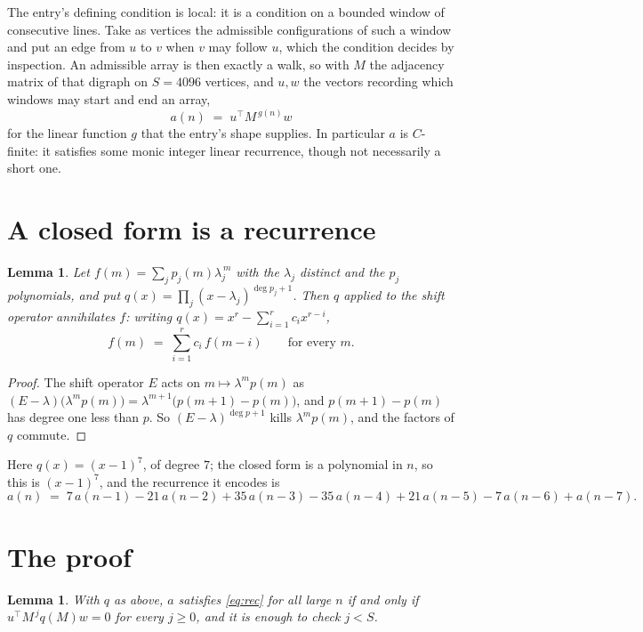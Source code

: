 \documentclass[11pt,a4paper]{article}
\theoremstyle{plain}
\newtheorem{lemma}[theorem]{Lemma}
\theoremstyle{definition}
\begin{document}
The entry's defining condition is local: it is a condition on a bounded window of consecutive lines. Take as vertices the
admissible configurations of such a window and put an edge from $u$ to $v$ when $v$ may
follow $u$, which the condition decides by inspection. An admissible array is then exactly a
walk, so with $M$ the adjacency matrix of that digraph on $S=4096$ vertices, and $u,w$ the
vectors recording which windows may start and end an array,
\[
a(n)\;=\;u^{\!\top}M^{\,g(n)}w
\]
for the linear function $g$ that the entry's shape supplies. In particular $a$ is
$C$-finite: it satisfies some monic integer linear recurrence, though not necessarily a short
one.

\section{A closed form is a recurrence}

\begin{lemma}\label{lem:ann}
Let $f(m)=\sum_{j}p_j(m)\lambda_j^{\,m}$ with the $\lambda_j$ distinct and the $p_j$
polynomials, and put $q(x)=\prod_j(x-\lambda_j)^{\deg p_j+1}$. Then $q$ applied to the shift
operator annihilates $f$: writing $q(x)=x^{r}-\sum_{i=1}^{r}c_ix^{r-i}$,
\[
f(m)\;=\;\sum_{i=1}^{r}c_i\,f(m-i)\qquad\text{for every }m.
\]
\end{lemma}

\begin{proof}
The shift operator $E$ acts on $m\mapsto\lambda^{m}p(m)$ as
$(E-\lambda)\bigl(\lambda^{m}p(m)\bigr)=\lambda^{m+1}\bigl(p(m+1)-p(m)\bigr)$, and
$p(m+1)-p(m)$ has degree one less than $p$. So $(E-\lambda)^{\deg p+1}$ kills
$\lambda^{m}p(m)$, and the factors of $q$ commute.
\end{proof}

Here $q(x)=(x-1)^{7}$, of degree $7$; the closed form is a polynomial in $n$, so this is $(x-1)^{7}$, and the recurrence it encodes is
\begin{equation}\label{eq:rec}
a(n)\;=\;7\,a(n-1) - 21\,a(n-2) + 35\,a(n-3) - 35\,a(n-4) + 21\,a(n-5) - 7\,a(n-6) + a(n-7).
\end{equation}

\section{The proof}

\begin{lemma}\label{lem:crit}
With $q$ as above, $a$ satisfies \eqref{eq:rec} for all large $n$ if and only if
$u^{\!\top}M^{\,j}q(M)w=0$ for every $j\ge0$, and it is enough to check $j<S$.
\end{lemma}
\end{document}
